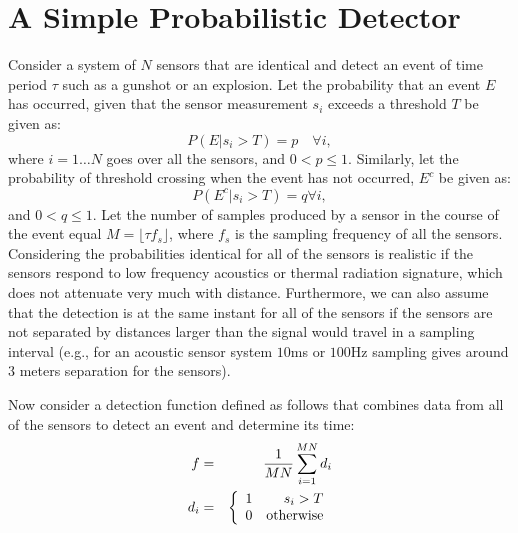\section{A Simple Probabilistic Detector}
Consider a system of $N$ sensors that are identical and detect an
event of time period $\tau$ such as a gunshot or an explosion. Let
the probability that an event $E$ has occurred, given that the
sensor measurement $s_i$ exceeds a threshold $T$ be given as:
\begin{equation}
P(E|s_i>T)=p \quad \forall i\label{eqn:detrate},
\end{equation}
where $i=1\ldots N$ goes over all the sensors, and $0<p\leq 1$.
Similarly, let the probability of threshold crossing when the
event has not occurred, $E^c$ be given as:
\begin{equation}
P(E^c|s_i>T)=q \forall i\label{eqn:fprate},
\end{equation}
and $0<q\leq 1$. Let the number of samples produced by a sensor in
the course of the event equal $M=\lfloor \tau f_s \rfloor$, where
$f_s$ is the sampling frequency of all the sensors. Considering
the probabilities identical for all of the sensors is realistic if
the sensors respond to low frequency acoustics or thermal
radiation signature, which does not attenuate very much with
distance. Furthermore, we can also assume that the detection is at
the same instant for all of the sensors if the sensors are not
separated by distances larger than the signal would travel in a
sampling interval (e.g., for an acoustic sensor system $10$ms or
$100$Hz sampling gives around $3$ meters separation for the
sensors).

Now consider a detection function defined as follows that combines
data from all of the sensors to detect an event and determine its
time:
\begin{eqnarray}
  f &=& {1\over MN}\sum_{i=1}^{MN}d_i\label{eqn:detector} \\
  d_i &=&\left\{\begin{array}{lr}
  1 & s_i>T\\
  0 & {\rm otherwise}\end{array}\right.
\end{eqnarray}

